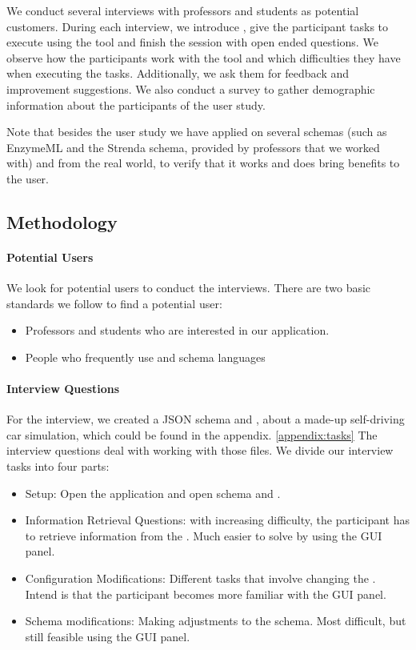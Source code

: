 We conduct several interviews with professors and students as potential customers.
During each interview, we introduce \toolname{}, give the participant tasks to execute using the tool and finish the session with open ended questions.
We observe how the participants work with the tool and which difficulties they have when executing the tasks.
Additionally, we ask them for feedback and improvement suggestions.
We also conduct a survey to gather demographic information about the participants of the user study.

Note that besides the user study we have applied \toolname{} on several schemas (such as EnzymeML\cite{TODO} and the Strenda schema\cite{TODO}, provided by professors that we worked with) and \cfgfiles{} from the real world, to verify that it works and does bring benefits to the user.

\subsection{Methodology}\label{subsec:methodology} %

\paragraph{Potential Users}
We look for potential users to conduct the interviews.
There are two basic standards we follow to find a potential user:
\begin{itemize}
    \item Professors and students who are interested in our application.
    \item People who frequently use \cfgfiles and schema languages
\end{itemize}

\paragraph{Interview Questions}
For the interview, we created a JSON schema and \cfgfile{}, about a made-up self-driving car simulation, which could be found in the appendix. \ref{appendix:tasks}
The interview questions deal with working with those files.
We divide our interview tasks into four parts:
\begin{itemize}
    \item Setup: Open the application and open schema and \cfgfile.
    \item Information Retrieval Questions: with increasing difficulty, the participant has to retrieve information from the \cfgfile{}.
    Much easier to solve by using the GUI panel.
    \item Configuration Modifications: Different tasks that involve changing the \cfgfile{}.
    Intend is that the participant becomes more familiar with the GUI panel.
    \item Schema modifications: Making adjustments to the schema.
    Most difficult, but still feasible using the GUI panel.
\end{itemize}

